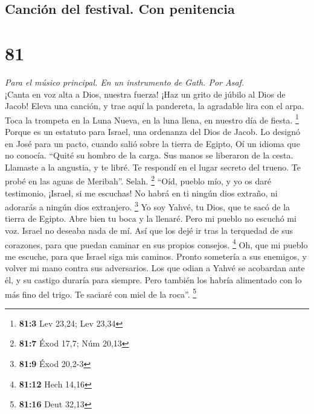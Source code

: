 \begin{paracol}{2}
{\subsection{Canción del festival. Con
penitencia}\label{canciuxf3n-del-festival.-con-penitencia}}

\hypertarget{section-160}{%
\section{81}\label{section-160}}

\emph{Para el músico principal. En un instrumento de Gath. Por Asaf.}\\
 ¡Canta en voz alta a Dios, nuestra fuerza! ¡Haz un grito
de júbilo al Dios de Jacob!  Eleva una canción, y trae
aquí la pandereta, la agradable lira con el arpa.  Toca la
trompeta en la Luna Nueva, en la luna llena, en nuestro día de fiesta.
\footnote{\textbf{81:3} Lev 23,24; Lev 23,34}  Porque es
un estatuto para Israel, una ordenanza del Dios de Jacob. 
Lo designó en José para un pacto, cuando salió sobre la tierra de
Egipto, Oí un idioma que no conocía.  ``Quité su hombro de
la carga. Sus manos se liberaron de la cesta.  Llamaste a
la angustia, y te libré. Te respondí en el lugar secreto del trueno. Te
probé en las aguas de Meribah''. Selah. \footnote{\textbf{81:7} Éxod
  17,7; Núm 20,13}  ``Oíd, pueblo mío, y yo os daré
testimonio, ¡Israel, si me escuchas!  No habrá en ti
ningún dios extraño, ni adorarás a ningún dios extranjero. \footnote{\textbf{81:9}
  Éxod 20,2-3}  Yo soy Yahvé, tu Dios, que te sacó de la
tierra de Egipto. Abre bien tu boca y la llenaré.  Pero
mi pueblo no escuchó mi voz. Israel no deseaba nada de mí.
 Así que los dejé ir tras la terquedad de sus corazones,
para que puedan caminar en sus propios consejos. \footnote{\textbf{81:12}
  Hech 14,16}  Oh, que mi pueblo me escuche, para que
Israel siga mis caminos.  Pronto sometería a sus
enemigos, y volver mi mano contra sus adversarios.  Los
que odian a Yahvé se acobardan ante él, y su castigo duraría para
siempre.  Pero también los habría alimentado con lo más
fino del trigo. Te saciaré con miel de la roca''. \footnote{\textbf{81:16}
  Deut 32,13}

\switchcolumn
\begin{otherlanguage}{english}


\end{otherlanguage}
\end{paracol}

